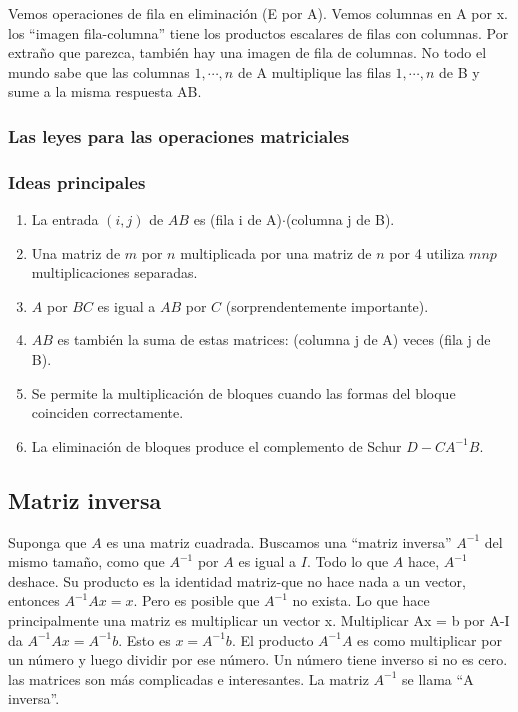 Vemos operaciones de fila en eliminación (E por A). Vemos columnas en A por x. los
``imagen fila-columna'' tiene los productos escalares de filas con columnas. Por extraño que parezca,
también hay una imagen de fila de columnas. No todo el mundo sabe que las columnas $1,\cdots, n$ de A
multiplique las filas  $1,\cdots, n$ de B y sume a la misma respuesta AB.

\subsubsection{Las leyes para las operaciones matriciales}

\subsubsection{Ideas principales}

\begin{enumerate}
	\item La entrada $(i, j)$ de $AB$ es (fila i de A)$\cdot$(columna j de B).
	\item Una matriz de $m$ por $n$ multiplicada por una matriz de $n$ por 4 utiliza $mnp$ multiplicaciones separadas.
	\item $A$ por $BC$ es igual a $AB$ por $C$ (sorprendentemente importante).
	\item $AB$ es también la suma de estas matrices: (columna j de A) veces (fila j de B).
	\item Se permite la multiplicación de bloques cuando las formas del bloque coinciden correctamente.
	\item La eliminación de bloques produce el complemento de Schur $D-CA^{-1}B$.
\end{enumerate}

\subsection{Matriz inversa}

Suponga que $A$ es una matriz cuadrada. Buscamos una ``matriz inversa'' $A^{-1}$ del mismo tamaño, como
que $A^{-1}$ por $A$ es igual a $I$. Todo lo que $A$ hace, $A^{-1}$ deshace. Su producto es la identidad
matriz-que no hace nada a un vector, entonces $A^{-1}Ax = x$. Pero es posible que $A^{-1}$ no exista.
Lo que hace principalmente una matriz es multiplicar un vector x. Multiplicar Ax = b por A-I
da $A^{-1}Ax =A^{-1}b$. Esto es $x = A^{-1}b$. El producto $A^{-1}A$ es como multiplicar por
un número y luego dividir por ese número. Un número tiene inverso si no es cero.
las matrices son más complicadas e interesantes. La matriz $A^{-1}$ se llama ``A inversa''.

